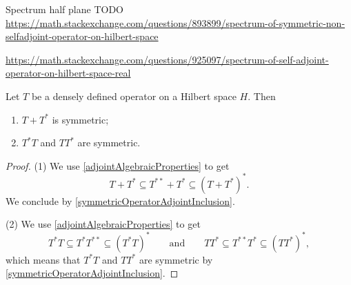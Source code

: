 \begin{example}
Spectrum half plane TODO \url{https://math.stackexchange.com/questions/893899/spectrum-of-symmetric-non-selfadjoint-operator-on-hilbert-space}

\url{https://math.stackexchange.com/questions/925097/spectrum-of-self-adjoint-operator-on-hilbert-space-real}
\end{example}

\begin{proposition} \label{symmetryAdjointConstructions}
Let $T$ be a densely defined operator on a Hilbert space $H$. Then
\begin{enumerate}
\item $T+T^*$ is symmetric;
\item $T^*T$ and $TT^*$ are symmetric.
\end{enumerate}
\end{proposition}
\begin{proof}
(1) We use \ref{adjointAlgebraicProperties} to get
\[ T+T^* \subseteq T^{**} + T^* \subseteq (T+T^*)^*. \]
We conclude by \ref{symmetricOperatorAdjointInclusion}.

(2) We use \ref{adjointAlgebraicProperties} to get
\[ T^*T \subseteq T^*T^{**} \subseteq (T^*T)^* \qquad\text{and}\qquad TT^* \subseteq T^{**}T^* \subseteq (TT^*)^*, \]
which means that $T^*T$ and $TT^*$ are symmetric by \ref{symmetricOperatorAdjointInclusion}.
\end{proof}

